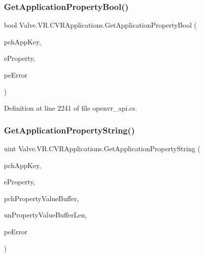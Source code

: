 \subsubsection{\texorpdfstring{GetApplicationPropertyBool()}{GetApplicationPropertyBool()}}
{\footnotesize\ttfamily bool Valve.\+V\+R.\+C\+V\+R\+Applications.\+Get\+Application\+Property\+Bool (\begin{DoxyParamCaption}\item[{string}]{pch\+App\+Key,  }\item[{\mbox{\hyperlink{namespace_valve_1_1_v_r_a60802f09ad1b4764cd5bc78369d50bf3}{E\+V\+R\+Application\+Property}}}]{e\+Property,  }\item[{ref \mbox{\hyperlink{namespace_valve_1_1_v_r_a3488adab8a219b579fcee50f4e63a8b6}{E\+V\+R\+Application\+Error}}}]{pe\+Error }\end{DoxyParamCaption})}



Definition at line 2241 of file openvr\+\_\+api.\+cs.

\mbox{\label{class_valve_1_1_v_r_1_1_c_v_r_applications_a623fedcbaacfe1e1b7d74ff709a9d869}} 
\subsubsection{\texorpdfstring{GetApplicationPropertyString()}{GetApplicationPropertyString()}}
{\footnotesize\ttfamily uint Valve.\+V\+R.\+C\+V\+R\+Applications.\+Get\+Application\+Property\+String (\begin{DoxyParamCaption}\item[{string}]{pch\+App\+Key,  }\item[{\mbox{\hyperlink{namespace_valve_1_1_v_r_a60802f09ad1b4764cd5bc78369d50bf3}{E\+V\+R\+Application\+Property}}}]{e\+Property,  }\item[{System.\+Text.\+String\+Builder}]{pch\+Property\+Value\+Buffer,  }\item[{uint}]{un\+Property\+Value\+Buffer\+Len,  }\item[{ref \mbox{\hyperlink{namespace_valve_1_1_v_r_a3488adab8a219b579fcee50f4e63a8b6}{E\+V\+R\+Application\+Error}}}]{pe\+Error }\end{DoxyParamCaption})}



